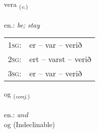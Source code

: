 \documentclass[frontgrid, backgrid]{flacards}\usepackage[]{graphicx}\usepackage[]{xcolor}
\begin{document}
\doublespacing











\renewcommand{\flhead}{\vskip5pt \fboxsep=0pt {\small\bfseries\footnotesize Sagnorð | Verb}}
\renewcommand{\fcfoot}{\vskip5pt \fboxsep=0pt \hspace{2pt}{\small\bfseries\footnotesize 1K}}

\renewcommand{\blhead}{\vskip5pt {\small\bfseries\footnotesize Sagnorð | Verb }}
\renewcommand{\bcfoot}{\vskip5pt \hspace{2pt}{\small\bfseries\footnotesize 1K}}


{vera \small{\textsubscript{(\textit{v.})}} \\[1ex] %
\textphonetic{[vɛːra]} \\
en.: \emph{be; stay} \\  [2ex]
\renewcommand*{\arraystretch}{0.8}
\begin{tabular}{p{1cm}l}
\textsc{1sg}: & er -- var -- verið \\ 
\textsc{2sg}: & ert -- varst -- verið \\ 
\textsc{3sg}: & er -- var -- verið \\ 
\end{tabular}
}


\renewcommand{\flhead}{\vskip5pt \fboxsep=0pt {\small\bfseries\footnotesize Samtenging | Conjuction}}
\renewcommand{\fcfoot}{\vskip5pt \fboxsep=0pt \hspace{2pt}{\small\bfseries\footnotesize 1K}}

\renewcommand{\blhead}{\vskip5pt {\small\bfseries\footnotesize Samtenging | Conjuction }}
\renewcommand{\bcfoot}{\vskip5pt \hspace{2pt}{\small\bfseries\footnotesize 1K}}


{og \small{\textsubscript{(\textit{conj.})}} \\[1ex]
\textphonetic{[ɔːɣ]} \\
en.: \emph{and} \\  [2ex]
og (Indeclinable)}
\end{document}

